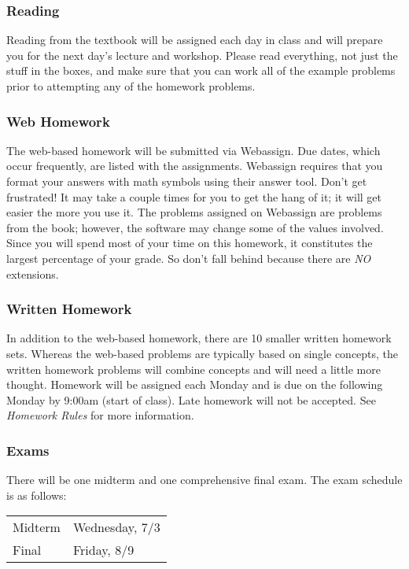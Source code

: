 \documentclass[letterpaper,12pt,fleqn]{article}
\begin{document}
\subsubsection*{Reading}

Reading from the textbook will be assigned each day in class and will prepare you for the next day's lecture and
workshop.  Please read everything, not just the stuff in the boxes, and make sure that you can work all of the example
problems prior to attempting any of the homework problems.

\subsubsection*{Web Homework}

The web-based homework will be submitted via Webassign.  Due dates, which occur frequently, are listed with the assignments.
Webassign requires that you format your answers with math symbols using their answer tool.  Don't get frustrated!  It may
take a couple times for you to get the hang of it; it will get easier the more you use it.  The problems assigned on
Webassign are problems from the book; however, the software may change some of the values involved.  Since you will spend
most of your time on this homework, it constitutes the largest percentage of your grade.  So don't fall behind because there
are \emph{NO} extensions.

\subsubsection*{Written Homework}

In addition to the web-based homework, there are 10 smaller written homework sets.  Whereas the web-based problems are
typically based on single concepts, the written homework problems will combine concepts and will need a little more
thought.  Homework will be assigned each Monday and is due on the following Monday by 9:00am (start of class).  Late
homework will not be accepted.  See \emph{Homework Rules} for more information.

\subsubsection*{Exams}

There will be one midterm and one comprehensive final exam.  The exam schedule is as follows:

\bigskip

\begin{tabular}{ll}
  Midterm & Wednesday, 7/3 \\
  Final & Friday, 8/9
\end{tabular}
  
\end{document}
